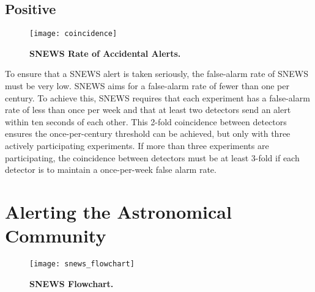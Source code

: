 	\subsection*{Positive}
	\label{sec:snews_positive}
	\begin{wrapfigure}{r}{0.7\textwidth}
		\vspace{-0.25in}
		\centering
		\texttt{[image: coincidence]}
		\caption[SNEWS Rate of Accidental Alerts]{\bf SNEWS Rate of Accidental Alerts.\rm }
		\label{fig:coincidence}
		\vspace{-0.074in}
	\end{wrapfigure}
	To ensure that a SNEWS alert is taken seriously, the false-alarm rate of SNEWS must be very low. SNEWS aims for a false-alarm rate of fewer than one per century. To achieve this, SNEWS requires that each experiment has a false-alarm rate of less than once per week and that at least two detectors send an alert within ten seconds of each other. This 2-fold coincidence between detectors ensures the once-per-century threshold can be achieved, but only with three actively participating experiments. If more than three experiments are participating, the coincidence between detectors must be at least 3-fold if each detector is to maintain a once-per-week false alarm rate.



	\section{Alerting the Astronomical Community}
	\begin{wrapfigure}{R}{0.7\textwidth}
		\centering
		\texttt{[image: snews\_flowchart]}
		\caption[SNEWS Flowchart]{\bf SNEWS Flowchart.\rm }
		\label{fig:flowchart}
		\vspace{0.0in}
	\end{wrapfigure}
	\filler


